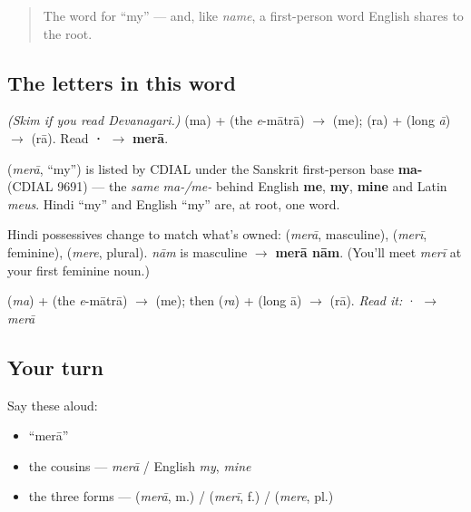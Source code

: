 \label{lesson:HI-C02-meraa}



\begin{quote}
The word for \textquotedblleft{}my\textquotedblright{} — and, like \emph{name}, a first-person word English shares to the root.
\end{quote}

\subsection*{The letters in this word}
\emph{(Skim if you read Devanagari.)} \textbf{} (ma) + \textbf{} (the \emph{e}-mātrā) $\to$ \textbf{} (me); \textbf{} (ra) + \textbf{} (long \emph{ā}) $\to$ \textbf{} (rā). Read \textbf{·} $\to$ \textbf{merā}.

\begin{cousinweb}
\textbf{} (\emph{merā}, \textquotedblleft{}my\textquotedblright{}) is listed by CDIAL under the Sanskrit first-person base \textbf{ma-} (CDIAL 9691) — the \emph{same} \emph{ma-/me-} behind English \textbf{me}, \textbf{my}, \textbf{mine} and Latin \emph{meus}. Hindi \textquotedblleft{}my\textquotedblright{} and English \textquotedblleft{}my\textquotedblright{} are, at root, one word.
\end{cousinweb}

\begin{grammarlens}[title={Grammar Lens: \textquotedblleft{}my\textquotedblright{} agrees with the noun}]
Hindi possessives change to match what's owned: \textbf{} (\emph{merā}, masculine), \textbf{} (\emph{merī}, feminine), \textbf{} (\emph{mere}, plural). \emph{nām} is masculine $\to$ \textbf{merā nām}. (You'll meet \emph{merī} at your first feminine noun.)
\end{grammarlens}

\begin{sounds}
 (\emph{ma}) +  (the \emph{e}-mātrā) $\to$  (me); then  (\emph{ra}) +  (long ā) $\to$  (rā). \emph{Read it:} · $\to$ \emph{merā}
\end{sounds}

\subsection*{Your turn}
Say these aloud:

\begin{itemize}
\raggedright
  \item \textquotedblleft{}merā\textquotedblright{}
  \item the cousins — \emph{merā} / English \emph{my}, \emph{mine}
  \item the three forms —  (\emph{merā}, m.) /  (\emph{merī}, f.) /  (\emph{mere}, pl.)
\end{itemize}

